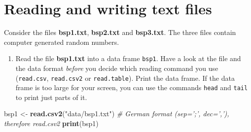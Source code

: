 \documentclass[]{article}
\newenvironment{Shaded}{\begin{snugshade}}{\end{snugshade}}
\newcommand{\KeywordTok}[1]{\textcolor[rgb]{0.13,0.29,0.53}{\textbf{#1}}}
\newcommand{\StringTok}[1]{\textcolor[rgb]{0.31,0.60,0.02}{#1}}
\newcommand{\CommentTok}[1]{\textcolor[rgb]{0.56,0.35,0.01}{\textit{#1}}}
\newcommand{\NormalTok}[1]{#1}
\providecommand{\tightlist}{%
  \setlength{\itemsep}{0pt}\setlength{\parskip}{0pt}}
\begin{document}
\section{Reading and writing text
files}\label{reading-and-writing-text-files}

Consider the files \textbf{bsp1.txt}, \textbf{bsp2.txt} and
\textbf{bsp3.txt}. The three files contain computer generated random
numbers.

\begin{enumerate}
\def\labelenumi{\arabic{enumi}.}
\tightlist
\item
  Read the file \textbf{bsp1.txt} into a data frame \texttt{bsp1}. Have
  a look at the file and the data format \emph{before} you decide which
  reading command you use (\texttt{read.csv}, \texttt{read.csv2} or
  \texttt{read.table}). Print the data frame. If the data frame is too
  large for your screen, you can use the commands \texttt{head} and
  \texttt{tail} to print just parts of it.
\end{enumerate}

\begin{Shaded}
\begin{Highlighting}[]
\NormalTok{bsp1 <-}\StringTok{ }\KeywordTok{read.csv2}\NormalTok{(}\StringTok{"data/bsp1.txt"}\NormalTok{)  }\CommentTok{# German format (sep=';', dec=','), therefore read.csv2}
\KeywordTok{print}\NormalTok{(bsp1)}
\end{Highlighting}
\end{Shaded}
\end{document}
